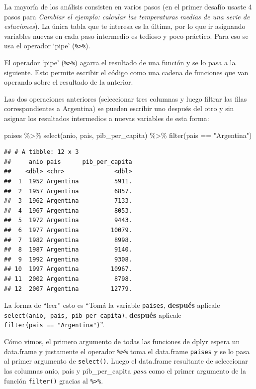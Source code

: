 \documentclass[
  openany]{book}
\newenvironment{Shaded}{\begin{snugshade}}{\end{snugshade}}
\newcommand{\FunctionTok}[1]{\textcolor[rgb]{0.00,0.00,0.00}{#1}}
\newcommand{\NormalTok}[1]{#1}
\newcommand{\SpecialCharTok}[1]{\textcolor[rgb]{0.00,0.00,0.00}{#1}}
\newcommand{\StringTok}[1]{\textcolor[rgb]{0.31,0.60,0.02}{#1}}
\begin{document}
La mayoría de los análisis consisten en varios pasos (en el primer desafío usaste 4 pasos para \emph{Cambiar el ejemplo: calcular las temperaturas medias de una serie de estaciones}).
La única tabla que te interesa es la última, por lo que ir asignando variables nuevas en cada paso intermedio es tedioso y poco práctico.
Para eso se usa el operador `pipe' (\texttt{\%\textgreater{}\%}).

El operador `pipe' (\texttt{\%\textgreater{}\%}) agarra el resultado de una función y se lo pasa a la siguiente.
Esto permite escribir el código como una cadena de funciones que van operando sobre el resultado de la anterior.

Las dos operaciones anteriores (seleccionar tres columnas y luego filtrar las filas correspondientes a Argentina) se pueden escribir uno después del otro y sin asignar los resultados intermedios a nuevas variables de esta forma:

\begin{Shaded}
\begin{Highlighting}[]
\NormalTok{paises }\SpecialCharTok{\%\textgreater{}\%} 
  \FunctionTok{select}\NormalTok{(anio, pais, pib\_per\_capita) }\SpecialCharTok{\%\textgreater{}\%} 
  \FunctionTok{filter}\NormalTok{(pais }\SpecialCharTok{==} \StringTok{"Argentina"}\NormalTok{)}
\end{Highlighting}
\end{Shaded}

\begin{verbatim}
## # A tibble: 12 x 3
##     anio pais      pib_per_capita
##    <dbl> <chr>              <dbl>
##  1  1952 Argentina          5911.
##  2  1957 Argentina          6857.
##  3  1962 Argentina          7133.
##  4  1967 Argentina          8053.
##  5  1972 Argentina          9443.
##  6  1977 Argentina         10079.
##  7  1982 Argentina          8998.
##  8  1987 Argentina          9140.
##  9  1992 Argentina          9308.
## 10  1997 Argentina         10967.
## 11  2002 Argentina          8798.
## 12  2007 Argentina         12779.
\end{verbatim}

La forma de ``leer'' esto es ``Tomá la variable \texttt{paises}, \textbf{después} aplicale \texttt{select(anio,\ pais,\ pib\_per\_capita)}, \textbf{después} aplicale \texttt{filter(pais\ ==\ "Argentina")}''.

Cómo vimos, el primero argumento de todas las funciones de dplyr espera un data.frame y justamente el operador \texttt{\%\textgreater{}\%} toma el data.frame \texttt{paises} y se lo pasa al primer argumento de \texttt{select()}.
Luego el data.frame resultante de seleccionar las columnas anio, país y pib\_per\_capita \emph{pasa} como el primer argumento de la función \texttt{filter()} gracias al \texttt{\%\textgreater{}\%}.
\end{document}
